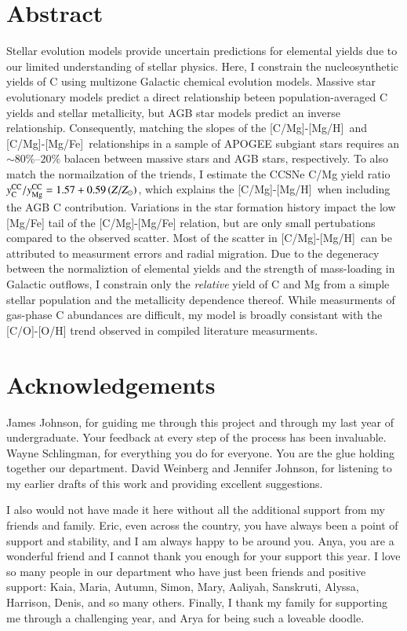 \documentclass[12pt,oneside]{report}
\newcommand{\caah}{[C/Mg]-[Mg/H]}
\newcommand{\caafe}{[C/Mg]-[Mg/Fe]}
\newcommand{\Ycc}{\ensuremath{y_{\rm C}^{\rm CC}}}
\newcommand{\Yoc}{\ensuremath{y_{\rm Mg}^{\rm CC}}}
\begin{document}
\chapter*{Abstract}
Stellar evolution models provide uncertain predictions for elemental yields due to our limited understanding of stellar physics. 
Here, I constrain the nucleosynthetic yields of C using multizone Galactic chemical evolution models.
Massive star evolutionary models predict a direct relationship beteen population-averaged C yields and stellar metallicity, but AGB star models predict an inverse relationship.
Consequently, matching the slopes of the \caah\ and \caafe\ relationships in a sample of APOGEE subgiant stars requires an $\sim 80\%$--$20\%$ balacen between massive stars and AGB stars, respectively.
% 
To also match the normailzation of the triends, I estimate the CCSNe C/Mg yield ratio $\Ycc/\Yoc = 1.57 + 0.59 \left(Z/Z_\odot\right)$, which explains the \caah~when including the AGB C contribution.
%
Variations in the star formation history impact the low [Mg/Fe] tail of the [C/Mg]-[Mg/Fe] relation, but are only small pertubations compared to the observed scatter. Most of the scatter in \caah\ can be attributed to measurment errors and radial migration. 
% 
Due to the degeneracy between the normaliztion of elemental yields and the strength of mass-loading in Galactic outflows, I constrain only the {\it relative} yield of C and Mg from a simple stellar population and the metallicity dependence thereof. While measurments of gas-phase C abundances are difficult, my model is broadly consistant with the [C/O]-[O/H] trend observed in compiled literature measurments.


\chapter*{Acknowledgements}

James Johnson, for guiding me through this project and through my last year of undergraduate. Your feedback at every step of the process has been invaluable.
Wayne Schlingman, for everything you do for everyone. You are the glue holding together our department. David Weinberg and Jennifer Johnson, for listening to my earlier drafts of this work and providing excellent suggestions.

I also would not have made it here without all the additional support from my friends and family. Eric, even across the country, you have always been a point of support and stability, and I am always happy to be around you. Anya, you are a wonderful friend and I cannot thank you enough for your support this year. 
I love so many people in our department who have just been friends and positive support: Kaia, Maria, Autumn, Simon, Mary, Aaliyah, Sanskruti, Alyssa, Harrison, Denis, and so many others. 
Finally, I thank my family for supporting me through a challenging year, and Arya for being such a loveable doodle.
\end{document}
